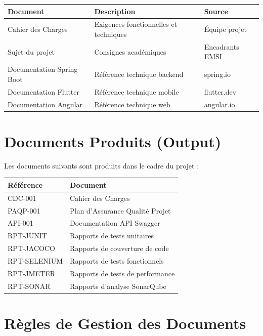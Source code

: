 \documentclass[12pt,a4paper]{report}
\begin{document}
\begin{center}
\begin{tabular}{|l|l|l|}
    \hline
    \textbf{Document} & \textbf{Description} & \textbf{Source} \\
    \hline
    Cahier des Charges & Exigences fonctionnelles et techniques & Équipe projet \\
    \hline
    Sujet du projet & Consignes académiques & Encadrants EMSI \\
    \hline
    Documentation Spring Boot & Référence technique backend & spring.io \\
    \hline
    Documentation Flutter & Référence technique mobile & flutter.dev \\
    \hline
    Documentation Angular & Référence technique web & angular.io \\
    \hline
\end{tabular}
\end{center}

\section{Documents Produits (Output)}

Les documents suivants sont produits dans le cadre du projet :

\begin{center}
\begin{tabular}{|l|l|}
    \hline
    \textbf{Référence} & \textbf{Document} \\
    \hline
    CDC-001 & Cahier des Charges\\
    \hline
    PAQP-001 & Plan d'Assurance Qualité Projet \\
    \hline
    API-001 & Documentation API Swagger \\
    \hline
    RPT-JUNIT & Rapports de tests unitaires \\
    \hline
    RPT-JACOCO & Rapports de couverture de code \\
    \hline
    RPT-SELENIUM & Rapports de tests fonctionnels \\
    \hline
    RPT-JMETER & Rapports de tests de performance \\
    \hline
    RPT-SONAR & Rapports d'analyse SonarQube \\
    \hline
\end{tabular}
\end{center}

\section{Règles de Gestion des Documents}
\end{document}
